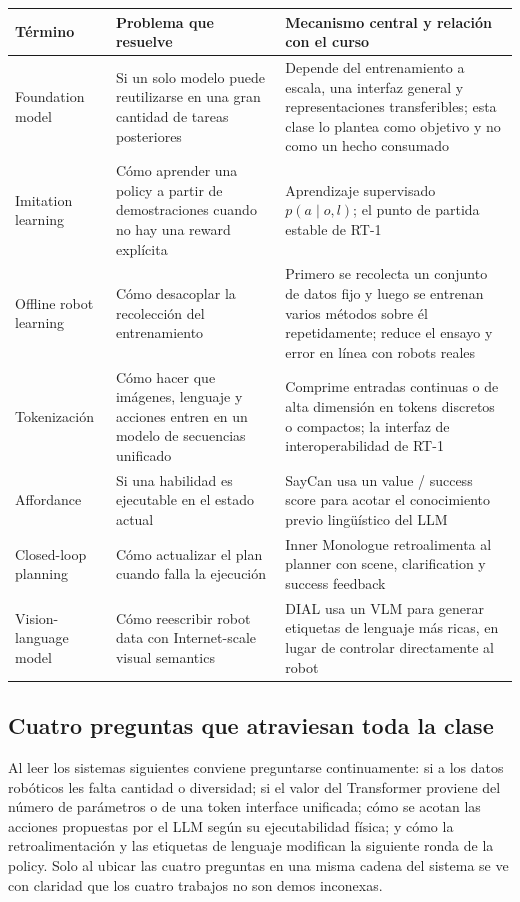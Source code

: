 \documentclass[a4paper]{article}
\begin{document}
\begin{longtable}{L{0.22\textwidth}L{0.30\textwidth}L{0.38\textwidth}}
\toprule
Término & Problema que resuelve & Mecanismo central y relación con el curso \\
\midrule
Foundation model & Si un solo modelo puede reutilizarse en una gran cantidad de tareas posteriores & Depende del entrenamiento a escala, una interfaz general y representaciones transferibles; esta clase lo plantea como objetivo y no como un hecho consumado \\
Imitation learning & Cómo aprender una policy a partir de demostraciones cuando no hay una reward explícita & Aprendizaje supervisado $p(a\mid o,l)$; el punto de partida estable de RT-1 \\
Offline robot learning & Cómo desacoplar la recolección del entrenamiento & Primero se recolecta un conjunto de datos fijo y luego se entrenan varios métodos sobre él repetidamente; reduce el ensayo y error en línea con robots reales \\
Tokenización & Cómo hacer que imágenes, lenguaje y acciones entren en un modelo de secuencias unificado & Comprime entradas continuas o de alta dimensión en tokens discretos o compactos; la interfaz de interoperabilidad de RT-1 \\
Affordance & Si una habilidad es ejecutable en el estado actual & SayCan usa un value / success score para acotar el conocimiento previo lingüístico del LLM \\
Closed-loop planning & Cómo actualizar el plan cuando falla la ejecución & Inner Monologue retroalimenta al planner con scene, clarification y success feedback \\
Vision-language model & Cómo reescribir robot data con Internet-scale visual semantics & DIAL usa un VLM para generar etiquetas de lenguaje más ricas, en lugar de controlar directamente al robot \\
\bottomrule
\end{longtable}

\subsection{Cuatro preguntas que atraviesan toda la clase}

Al leer los sistemas siguientes conviene preguntarse continuamente: si a los datos robóticos les falta cantidad o diversidad; si el valor del Transformer proviene del número de parámetros o de una token interface unificada; cómo se acotan las acciones propuestas por el LLM según su ejecutabilidad física; y cómo la retroalimentación y las etiquetas de lenguaje modifican la siguiente ronda de la policy. Solo al ubicar las cuatro preguntas en una misma cadena del sistema se ve con claridad que los cuatro trabajos no son demos inconexas.
\end{document}
